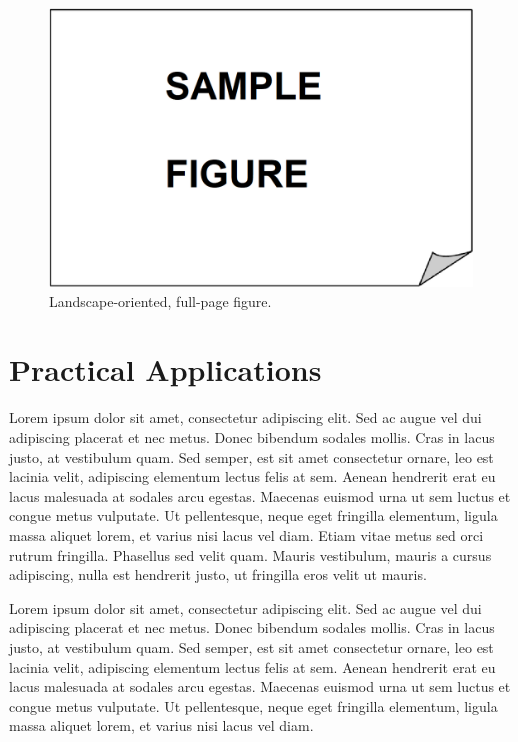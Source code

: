 \begin{landscape}
\thispagestyle{empty}
 \begin{figure}
 \vspace{-2mm}
 \centering
 \includegraphics[width=450pt,keepaspectratio=true]{./fig/sekil3}
 \vspace{4mm}
 \caption{Landscape-oriented, full-page figure.}    
      \vspace{55mm}
      \hspace{0cm}\pageref{fig:cshapeMapVMAT}
      \label{fig:cshapeMapVMAT}
\end{figure}
\end{landscape}

\section{Practical Applications}

Lorem ipsum dolor sit amet, consectetur adipiscing elit. Sed ac augue vel dui 
adipiscing placerat et nec metus. Donec bibendum sodales mollis. Cras in lacus 
justo, at vestibulum quam. Sed semper, est sit amet consectetur ornare, leo est 
lacinia velit, adipiscing elementum lectus felis at sem. Aenean hendrerit erat eu 
lacus malesuada at sodales arcu egestas. Maecenas euismod urna ut sem luctus et 
congue metus vulputate. Ut pellentesque, neque eget fringilla elementum, ligula 
massa aliquet lorem, et varius nisi lacus vel diam. Etiam vitae metus sed orci 
rutrum fringilla. Phasellus sed velit quam. Mauris vestibulum, mauris a cursus 
adipiscing, nulla est hendrerit justo, ut fringilla eros velit ut mauris.

Lorem ipsum dolor sit amet, consectetur adipiscing elit. Sed ac augue vel dui 
adipiscing placerat et nec metus. Donec bibendum sodales mollis. Cras in lacus 
justo, at vestibulum quam. Sed semper, est sit amet consectetur ornare, leo est 
lacinia velit, adipiscing elementum lectus felis at sem. Aenean hendrerit erat eu 
lacus malesuada at sodales arcu egestas. Maecenas euismod urna ut sem luctus et 
congue metus vulputate. Ut pellentesque, neque eget fringilla elementum, ligula 
massa aliquet lorem, et varius nisi lacus vel diam.

